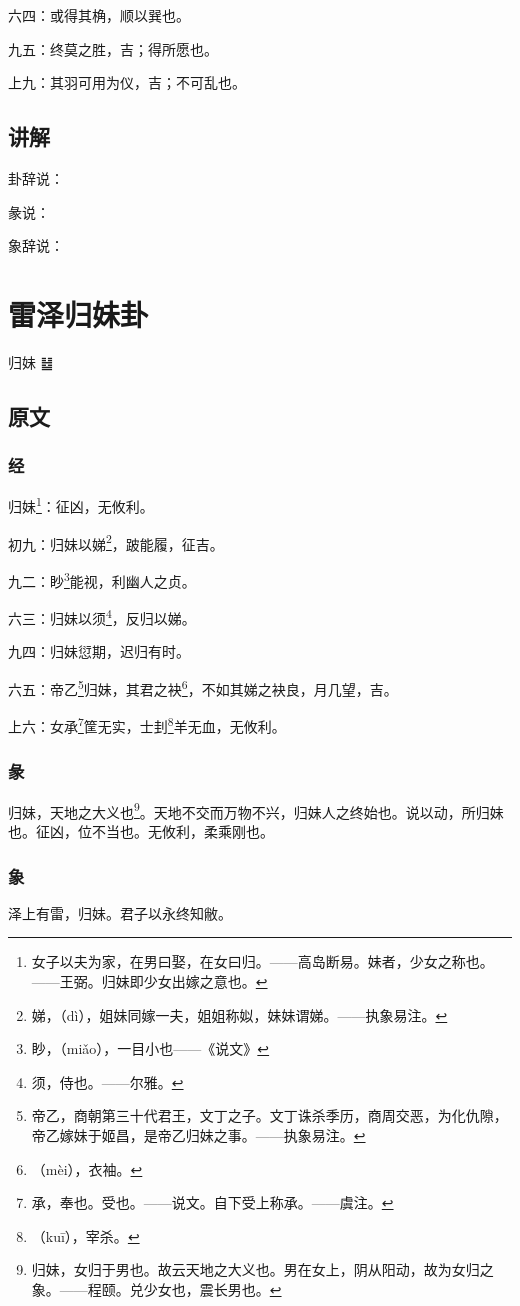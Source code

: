 \documentclass[12pt,oneside]{book}
\begin{document}
六四：或得其桷，顺以巽也。

九五：终莫之胜，吉；得所愿也。

上九：其羽可用为仪，吉；不可乱也。


\section{讲解}
卦辞说：

彖说：

象辞说：

\chapter{雷泽归妹卦}
归妹 {\Large ䷵}


\section{原文}

\subsection{经}
归妹\footnote{女子以夫为家，在男曰娶，在女曰归。——高岛断易。妹者，少女之称也。——王弼。归妹即少女出嫁之意也。}：征凶，无攸利。

初九：归妹以娣\footnote{娣，（dì），姐妹同嫁一夫，姐姐称姒，妹妹谓娣。——执象易注。}，跛能履，征吉。

九二：眇\footnote{眇，（miǎo），一目小也——《说文》}能视，利幽人之贞。

六三：归妹以须\footnote{须，侍也。——尔雅。}，反归以娣。

九四：归妹愆期，迟归有时。

六五：帝乙\footnote{帝乙，商朝第三十代君王，文丁之子。文丁诛杀季历，商周交恶，为化仇隙，帝乙嫁妹于姬昌，是帝乙归妹之事。——执象易注。}归妹，其君之袂\footnote{（mèi），衣袖。}，不如其娣之袂良，月几望，吉。

上六：女承\footnote{承，奉也。受也。——说文。自下受上称承。——虞注。}筐无实，士刲\footnote{（kuī），宰杀。}羊无血，无攸利。

\subsection{彖}
归妹，天地之大义也\footnote{归妹，女归于男也。故云天地之大义也。男在女上，阴从阳动，故为女归之象。——程颐。兑少女也，震长男也。}。天地不交而万物不兴，归妹人之终始也。说以动，所归妹也。征凶，位不当也。无攸利，柔乘刚也。

\subsection{象}
泽上有雷，归妹。君子以永终知敝。
\end{document}

